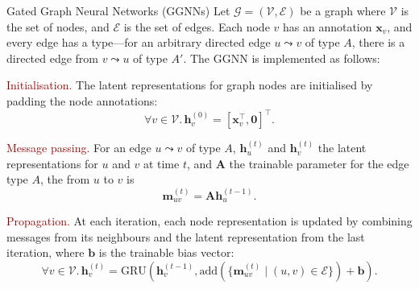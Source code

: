 \documentclass[final,hyperref={pdfpagelabels=false}]{beamer}
\begin{document}
\begin{frame}[t]
\begin{columns}[t]
\begin{column}{.3\textwidth}
      
      
    
     \vspace{-0.6in} 
    \begin{block}{Gated Graph Neural Networks (GGNNs)}
    Let $\mathcal{G}=(\mathcal{V}, \mathcal{E})$ be a graph where $\mathcal{V}$ is the set of nodes, and $\mathcal{E}$ is the set of edges. Each node $v$ has an annotation $\mathbf{x}_v$, and every edge has a type—for an arbitrary directed edge $u \leadsto v$ of type $A$, there is a directed edge from $v \leadsto u$ of type $A'$. The GGNN is implemented as follows:
    \vspace{0.2in}
    
    \textcolor{darkred}{Initialisation.} The latent representations for graph nodes are initialised by padding the node annotations:
    \begin{equation}
        \forall v \in \mathcal{V}. \, \mathbf{h}_v^{(0)} = [\mathbf{x}_v^\top, \mathbf{0}]^\top.
    \end{equation}
    
    
    \textcolor{darkred}{Message passing.} For an edge $u \leadsto v$ of type $A$, $\mathbf{h}_u^{(t)}$ and $\mathbf{h}_v^{(t)}$ the latent representations for $u$ and $v$ at time $t$, and $\mathbf{A}$ the trainable parameter for the edge type $A$, the from $u$ to $v$ is
    \begin{equation}
        \mathbf{m}_{uv}^{(t)} = \mathbf{A} \mathbf{h}_u^{(t-1)}.
    \end{equation}
    
    \textcolor{darkred}{Propagation.} At each iteration, each node representation is updated by combining messages from its neighbours and the latent representation from the last iteration, where $\mathbf{b}$ is the trainable bias vector:
    \begin{equation}
        \forall v \in \mathcal{V}. \, \mathbf{h}_v^{(t)} = \mathrm{GRU}\left(\mathbf{h}_v^{(t-1)}, 
        \mathrm{add}(\{\mathbf{m}_{uv}^{(t)} \mid (u, v) \in \mathcal{E} \}) + \mathbf{b}\right).
    \end{equation}


\end{block}
\end{column}
\end{columns}
\end{frame}
\end{document}
